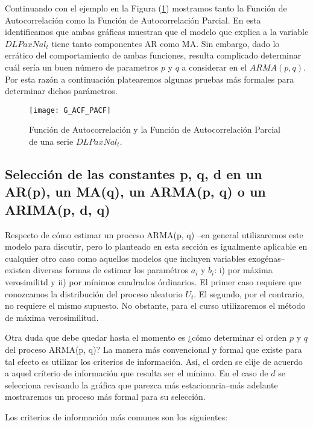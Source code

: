 \documentclass[
  a4paper,
]{article}
\begin{document}
Continuando con el ejemplo en la Figura (\ref{G_ACF_PACF}) mostramos
tanto la Función de Autocorrelación como la Función de Autocorrelación
Parcial. En esta identificamos que ambas gráficas muestran que el modelo
que explica a la variable \(DLPaxNal_t\) tiene tanto componentes AR como
MA. Sin embargo, dado lo errático del comportamiento de ambas funciones,
resulta complicado determinar cuál sería un buen número de parametros
\(p\) y \(q\) a considerar en el \(ARMA(p,q)\). Por esta razón a
continuación platearemos algunas pruebas más formales para determinar
dichos parámetros.

\begin{figure}
  \centering
    \texttt{[image: G\_ACF\_PACF]}
  \caption{Función de Autocorrelación y la Función de Autocorrelación Parcial de una serie $DLPaxNal_t$.}
  \label{G_ACF_PACF}
\end{figure}

\hypertarget{selecciuxf3n-de-las-constantes-p-q-d-en-un-arp-un-maq-un-armap-q-o-un-arimap-d-q}{%
\subsection{Selección de las constantes p, q, d en un AR(p), un MA(q),
un ARMA(p, q) o un ARIMA(p, d,
q)}\label{selecciuxf3n-de-las-constantes-p-q-d-en-un-arp-un-maq-un-armap-q-o-un-arimap-d-q}}

Respecto de cómo estimar un proceso ARMA(p, q) --en general utilizaremos
este modelo para discutir, pero lo planteado en esta sección es
igualmente aplicable en cualquier otro caso como aquellos modelos que
incluyen variables exogénas-- existen diversas formas de estimar los
paramétros \(a_i\) y \(b_i\): i) por máxima verosimilitd y ii) por
mínimos cuadrados órdinarios. El primer caso requiere que conozcamos la
distribución del proceso aleatorio \(U_t\). El segundo, por el
contrario, no requiere el mismo supuesto. No obstante, para el curso
utilizaremos el método de máxima verosimilitud.

Otra duda que debe quedar hasta el momento es ¿cómo determinar el orden
\(p\) y \(q\) del proceso ARMA(p, q)? La manera más convencional y
formal que existe para tal efecto es utilizar los criterios de
información. Así, el orden se elije de acuerdo a aquel críterio de
información que resulta ser el mínimo. En el caso de \(d\) se selecciona
revisando la gráfica que parezca más estacionaria--más adelante
mostraremos un proceso más formal para su selección.

Los criterios de información más comunes son los siguientes:
\end{document}
